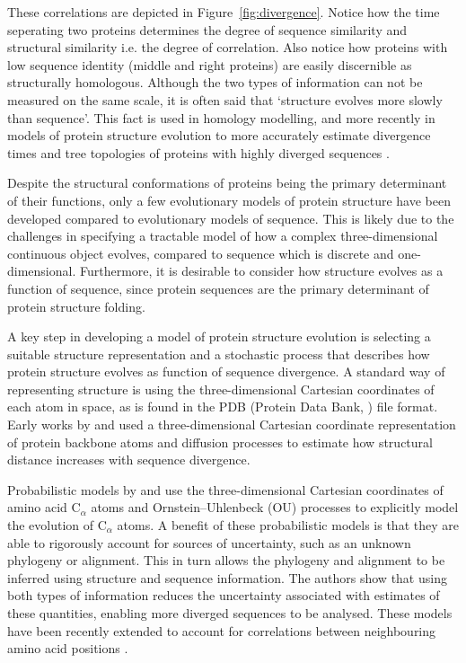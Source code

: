 \documentclass[nogrid]{MBE}%
\begin{document}
These correlations are depicted in Figure~\ref{fig:divergence}. Notice how the time seperating two proteins determines the degree of sequence similarity and  structural similarity i.e. the degree of correlation. Also notice how proteins with low sequence identity (middle and right proteins) are easily discernible as structurally homologous. Although the two types of information can not be measured on the same scale, it is often said that `structure evolves more slowly than sequence'. This fact is used in homology modelling, and more recently in models of protein structure evolution to more accurately estimate divergence times and tree topologies of proteins with  highly diverged sequences \citep{challis2012stochastic,herman2014simultaneous}.

Despite the structural conformations of proteins being the primary determinant of their functions, only a few evolutionary models of protein structure have been developed compared to evolutionary models of sequence. This is likely due to the challenges in specifying a tractable model of how a complex three-dimensional continuous object evolves, compared to sequence which is discrete and one-dimensional. Furthermore, it is desirable to consider how structure evolves as a function of sequence, since protein sequences are the primary determinant of protein structure folding.

A key step in developing a model of protein structure evolution is selecting a suitable structure representation and a stochastic process that describes how protein structure evolves as function of sequence divergence. A standard way of representing structure is using the three-dimensional Cartesian coordinates of each atom in space, as is found in the PDB (Protein Data Bank, \citet{berman2000protein}) file format. Early works by \citet{gutin1994evolution} and \citet{grishin1997estimation} used a three-dimensional Cartesian coordinate representation of protein backbone atoms and diffusion processes to estimate how structural distance increases with sequence divergence. 

Probabilistic models by \citet{challis2012stochastic} and \citet{herman2014simultaneous} use the three-dimensional Cartesian coordinates of amino acid  $\text{C}_{\alpha}$ atoms and Ornstein--Uhlenbeck (OU) processes to explicitly model the evolution of $\text{C}_{\alpha}$ atoms.  A benefit of these probabilistic models is that they are able to rigorously account for sources of uncertainty, such as an unknown phylogeny or alignment. This in turn allows the phylogeny and alignment to be inferred using structure and sequence information. The authors show that using both types of information reduces the uncertainty associated with estimates of these quantities, enabling more diverged sequences to be analysed. These models have been recently extended to account for correlations between neighbouring amino acid positions \citep{larson2018modeling}.
\end{document}
